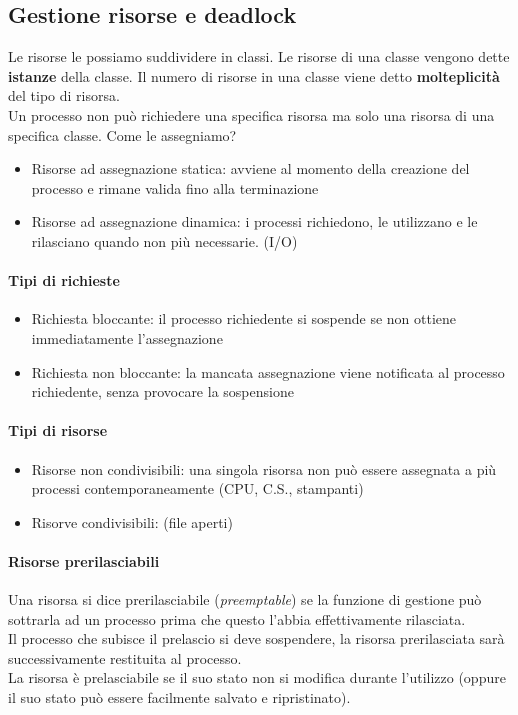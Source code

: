 \documentclass[a4paper,12pt]{article}
\begin{document}
\subsection{Gestione risorse e deadlock}
Le risorse le possiamo suddividere in classi. Le risorse di una classe vengono dette \textbf{istanze} della classe. Il numero di risorse in una classe viene detto \textbf{molteplicità} del tipo di risorsa.\\
Un processo non può richiedere una specifica risorsa ma solo una risorsa di una specifica classe. Come le assegniamo?
\begin{itemize}
  \item Risorse ad assegnazione statica: avviene al momento della creazione del processo e rimane valida fino alla terminazione
  \item Risorse ad assegnazione dinamica: i processi richiedono, le utilizzano e le rilasciano quando non più necessarie. (I/O)
\end{itemize}
\paragraph{Tipi di richieste}
\begin{itemize}
  \item Richiesta bloccante: il processo richiedente si sospende se non ottiene immediatamente l'assegnazione
  \item Richiesta non bloccante: la mancata assegnazione viene notificata al processo richiedente, senza provocare la sospensione
\end{itemize}
\paragraph{Tipi di risorse}
\begin{itemize}
  \item Risorse non condivisibili: una singola risorsa non può essere assegnata a più processi contemporaneamente (CPU, C.S., stampanti)
  \item Risorve condivisibili: (file aperti)
\end{itemize}
\paragraph{Risorse prerilasciabili}
Una risorsa si dice prerilasciabile (\textit{preemptable}) se la funzione di gestione può sottrarla ad un processo prima che questo l'abbia effettivamente rilasciata.\\
Il processo che subisce il prelascio si deve sospendere, la risorsa prerilasciata sarà successivamente restituita al processo.\\
La risorsa è prelasciabile se il suo stato non si modifica durante l'utilizzo (oppure il suo stato può essere facilmente salvato e ripristinato).
\end{document}
